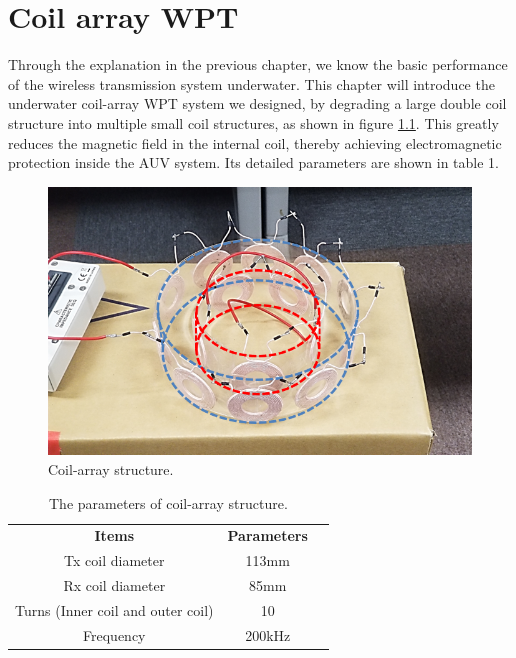 \chapter{Coil array WPT}
Through the explanation in the previous chapter, we know the basic performance of the wireless transmission system underwater. This chapter will introduce the underwater coil-array WPT system we designed, by degrading a large double coil structure into multiple small coil structures, as shown in figure \ref{fig:3_coil_array_structure}. This greatly reduces the magnetic field in the internal coil, thereby achieving electromagnetic protection inside the AUV system. Its detailed parameters are shown in table 1.

\begin{figure}[!b]
    \centering
    \includegraphics[width=0.7\linewidth]{images/3_coil_array_structure.png}
    \caption{Coil-array structure.}
    \label{fig:3_coil_array_structure}
\end{figure}

\begin{table}[!t]
    \centering
    \caption{The parameters of coil-array structure.}
    \begin{tabular}{ c|cc }
        \thickhline
        \textbf{Items}                    & \textbf{Parameters}      \\
        \thickhline
      
        Tx coil diameter                  & 113mm                    \\ \hline
        Rx coil diameter                  & 85mm                     \\ \hline
        Turns (Inner coil and outer coil) & 10                       \\ \hline
        Frequency                         & 200kHz                   \\ \hline
    \end{tabular}
    \label{table: coil array parameters}
\end{table}

